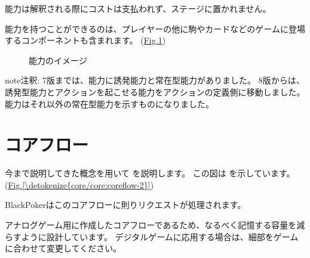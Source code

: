 \documentclass[letterpaper,10pt,dvipdfmx]{sphinxmanual}
\renewcommand{\spxentry}{\item}
\begin{document}
\sphinxAtStartPar
能力は解釈される際にコストは支払われず、ステージに置かれません。

\sphinxAtStartPar
能力を持つことができるのは、プレイヤーの他に駒やカードなどのゲームに登場するコンポーネントも含まれます。
(\hyperref[\detokenize{core/core:ability-image}]{Fig.\@ \ref{\detokenize{core/core:ability-image}}})

\begin{figure}[htbp]
\centering
\capstart

\noindent{}
\caption{能力のイメージ}\label{\detokenize{core/core:id38}}\label{\detokenize{core/core:ability-image}}\end{figure}

\begin{sphinxadmonition}{note}{注釈:}
\sphinxAtStartPar
7版までは、能力に誘発能力と常在型能力がありました。
8版からは、誘発型能力とアクションを起こせる能力をアクションの定義側に移動しました。
能力はそれ以外の常在型能力を示すものになりました。
\end{sphinxadmonition}

\index{コアフロー@\spxentry{コアフロー}}\ignorespaces 

\section{コアフロー}
\label{\detokenize{core/core:coreflowsec}}\label{\detokenize{core/core:index-19}}\label{\detokenize{core/core:id25}}
\sphinxAtStartPar
今まで説明してきた概念を用いて  を説明します。
この図は  を示しています。(\hyperref[\detokenize{core/core:coreflow-2}]{Fig.\@ \ref{\detokenize{core/core:coreflow-2}}})

\sphinxAtStartPar
BlackPokerはこのコアフローに則りリクエストが処理されます。

\sphinxAtStartPar
アナログゲーム用に作成したコアフローであるため、なるべく記憶する容量を減らすように設計しています。
デジタルゲームに応用する場合は、細部をゲームに合わせて変更してください。
\end{document}
